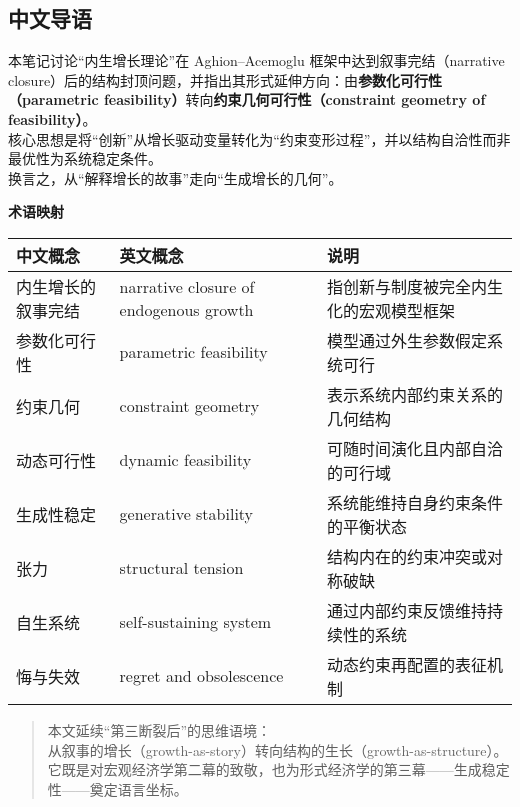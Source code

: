 \documentclass[11pt]{article}
\begin{document}
\begin{otherlanguage}{chinese}

\subsection{中文导语}\label{ux4e2dux6587ux5bfcux8bed}

本笔记讨论``内生增长理论''在 Aghion--Acemoglu
框架中达到叙事完结（narrative
closure）后的结构封顶问题，并指出其形式延伸方向：由\textbf{参数化可行性（parametric
feasibility）}转向\textbf{约束几何可行性（constraint geometry of
feasibility）}。\\
核心思想是将``创新''从增长驱动变量转化为``约束变形过程''，并以结构自洽性而非最优性为系统稳定条件。\\
换言之，从``解释增长的故事''走向``生成增长的几何''。

\textbf{术语映射}

{\def\LTcaptype{} %
\begin{longtable}[]{@{}
  >{\raggedright\arraybackslash}p{}
  >{\raggedright\arraybackslash}p{}
  >{\raggedright\arraybackslash}p{}@{}}
\toprule\noalign{}
\begin{minipage}[b]{\linewidth}\raggedright
中文概念
\end{minipage} & \begin{minipage}[b]{\linewidth}\raggedright
英文概念
\end{minipage} & \begin{minipage}[b]{\linewidth}\raggedright
说明
\end{minipage} \\
\midrule\noalign{}
\endhead
\bottomrule\noalign{}
\endlastfoot
内生增长的叙事完结 & narrative closure of endogenous growth &
指创新与制度被完全内生化的宏观模型框架 \\
参数化可行性 & parametric feasibility & 模型通过外生参数假定系统可行 \\
约束几何 & constraint geometry & 表示系统内部约束关系的几何结构 \\
动态可行性 & dynamic feasibility & 可随时间演化且内部自洽的可行域 \\
生成性稳定 & generative stability & 系统能维持自身约束条件的平衡状态 \\
张力 & structural tension & 结构内在的约束冲突或对称破缺 \\
自生系统 & self-sustaining system & 通过内部约束反馈维持持续性的系统 \\
悔与失效 & regret and obsolescence & 动态约束再配置的表征机制 \\
\end{longtable}
}

\begin{quote}
本文延续``第三断裂后''的思维语境：\\
从叙事的增长（growth-as-story）转向结构的生长（growth-as-structure）。\\
它既是对宏观经济学第二幕的致敬，也为形式经济学的第三幕------生成稳定性------奠定语言坐标。
\end{quote}

\end{otherlanguage}
\end{document}
